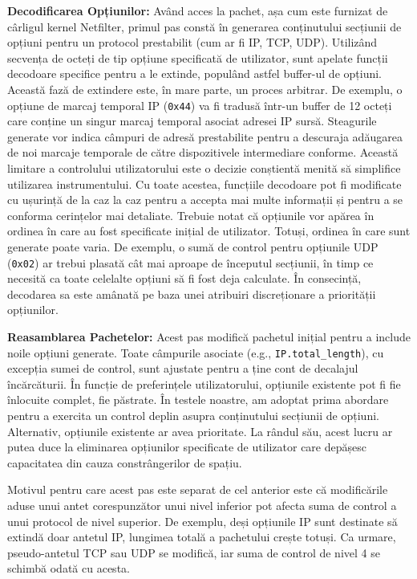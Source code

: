 \textbf{Decodificarea Opțiunilor:} Având acces la pachet, așa cum este furnizat de cârligul kernel Netfilter, primul pas constă în generarea conținutului secțiunii de opțiuni pentru un protocol prestabilit (cum ar fi IP, TCP, UDP). Utilizând secvența de octeți de tip opțiune specificată de utilizator, sunt apelate funcții decodoare specifice pentru a le extinde, populând astfel buffer-ul de opțiuni. Această fază de extindere este, în mare parte, un proces arbitrar. De exemplu, o opțiune de marcaj temporal IP (\texttt{0x44}) va fi tradusă într-un buffer de 12 octeți care conține un singur marcaj temporal asociat adresei IP sursă. Steagurile generate vor indica câmpuri de adresă prestabilite pentru a descuraja adăugarea de noi marcaje temporale de către dispozitivele intermediare conforme. Această limitare a controlului utilizatorului este o decizie conștientă menită să simplifice utilizarea instrumentului. Cu toate acestea, funcțiile decodoare pot fi modificate cu ușurință de la caz la caz pentru a accepta mai multe informații și pentru a se conforma cerințelor mai detaliate. Trebuie notat că opțiunile vor apărea în ordinea în care au fost specificate inițial de utilizator. Totuși, ordinea în care sunt generate poate varia. De exemplu, o sumă de control pentru opțiunile UDP (\texttt{0x02}) ar trebui plasată cât mai aproape de începutul secțiunii, în timp ce necesită ca toate celelalte opțiuni să fi fost deja calculate. În consecință, decodarea sa este amânată pe baza unei atribuiri discreționare a priorității opțiunilor.

\textbf{Reasamblarea Pachetelor:} Acest pas modifică pachetul inițial pentru a include noile opțiuni generate. Toate câmpurile asociate (e.g., \texttt{IP.total\_length}), cu excepția sumei de control, sunt ajustate pentru a ține cont de decalajul încărcăturii. În funcție de preferințele utilizatorului, opțiunile existente pot fi fie înlocuite complet, fie păstrate. În testele noastre, am adoptat prima abordare pentru a exercita un control deplin asupra conținutului secțiunii de opțiuni. Alternativ, opțiunile existente ar avea prioritate. La rândul său, acest lucru ar putea duce la eliminarea opțiunilor specificate de utilizator care depășesc capacitatea din cauza constrângerilor de spațiu.

 Motivul pentru care acest pas este separat de cel anterior este că modificările aduse unui antet corespunzător unui nivel inferior pot afecta suma de control a unui protocol de nivel superior. De exemplu, deși opțiunile IP sunt destinate să extindă doar antetul IP, lungimea totală a pachetului crește totuși. Ca urmare, pseudo-antetul TCP sau UDP se modifică, iar suma de control de nivel 4 se schimbă odată cu acesta.
